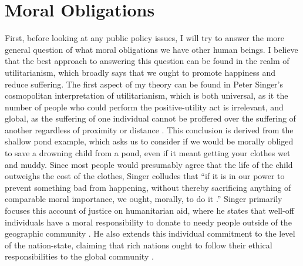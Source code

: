 \documentclass[12pt]{article}
\begin{document}
\section*{Moral Obligations}
First, before looking at any public policy issues, I will try to answer the more general question of what moral obligations we have other human beings.
I believe that the best approach to answering this question can be found in the realm of utilitarianism, which broadly says that we ought to promote happiness and reduce suffering.
The first aspect of my theory can be found in Peter Singer's cosmopolitan interpretation of utilitarianism, which is both universal, as it the number of people who could perform the positive-utility act is irrelevant, and global, as the suffering of one individual cannot be proffered over the suffering of another regardless of proximity or distance \autocite[154]{widdows2012}.
This conclusion is derived from the shallow pond example, which asks us to consider if we would be morally obliged to save a drowning child from a pond, even if it meant getting your clothes wet and muddy.
Since most people would presumably agree that the life of the child outweighs the cost of the clothes, Singer colludes that ``if it is in our power to prevent something bad from happening, without thereby sacrificing anything of comparable moral importance, we ought, morally, to do it \autocite[153]{widdows2012}.'' 
Singer primarily focuses this account of justice on humanitarian aid, where he states that well-off individuals have a moral responsibility to donate to needy people outside of the geographic community \autocite[155]{widdows2012}.
He also extends this individual commitment to the level of the nation-state, claiming that rich nations ought to follow their ethical responsibilities to the global community \autocite[15]{singer2016}.
\end{document}
